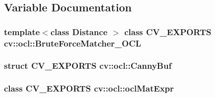 \subsection{Variable Documentation}
\hypertarget{namespacecv_1_1ocl_a3d60e5da2cd087e0a39c626535b8e07b}{
\subsubsection[{Brute\-Force\-Matcher\-\_\-\-O\-C\-L}]{\setlength{\rightskip}{0pt plus 5cm}template$<$class Distance $>$ class {\bf C\-V\-\_\-\-E\-X\-P\-O\-R\-T\-S} cv\-::ocl\-::\-Brute\-Force\-Matcher\-\_\-\-O\-C\-L}}\label{namespacecv_1_1ocl_a3d60e5da2cd087e0a39c626535b8e07b}
\hypertarget{namespacecv_1_1ocl_a3294ac7c1a42025e2a763b8b4432fa5d}{
\subsubsection[{Canny\-Buf}]{\setlength{\rightskip}{0pt plus 5cm}struct {\bf C\-V\-\_\-\-E\-X\-P\-O\-R\-T\-S} {\bf cv\-::ocl\-::\-Canny\-Buf}}}\label{namespacecv_1_1ocl_a3294ac7c1a42025e2a763b8b4432fa5d}
\hypertarget{namespacecv_1_1ocl_a5ba5f4fa9f494c17c0d0abe8b85b61af}{
\subsubsection[{ocl\-Mat\-Expr}]{\setlength{\rightskip}{0pt plus 5cm}class {\bf C\-V\-\_\-\-E\-X\-P\-O\-R\-T\-S} {\bf cv\-::ocl\-::ocl\-Mat\-Expr}}}\label{namespacecv_1_1ocl_a5ba5f4fa9f494c17c0d0abe8b85b61af}
